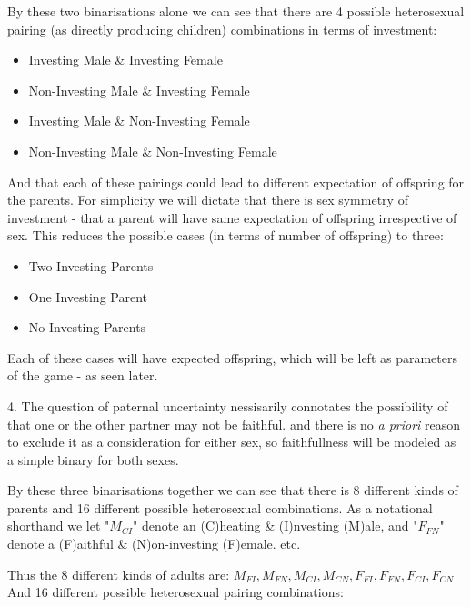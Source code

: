 \documentclass[journal,article,accept,oneauthors,pdftex,10pt,a4paper]{mdpi}
\begin{document}
By these two binarisations alone we can see that there are 4 possible heterosexual pairing (as directly producing children) combinations in terms of investment: 
\begin{itemize}
  \item Investing Male \& Investing Female
  \item Non-Investing Male \& Investing Female
  \item Investing Male \& Non-Investing Female
  \item Non-Investing Male \& Non-Investing Female
\end{itemize}
And that each of these pairings could lead to different expectation of offspring for the parents. For simplicity we will dictate that there is sex symmetry of investment - that a parent will have same expectation of offspring irrespective of sex. This reduces the possible cases (in terms of number of offspring) to three:
\begin{itemize}
  \item Two Investing Parents
  \item One Investing Parent
  \item No Investing Parents
\end{itemize}
Each of these cases will have expected offspring, which will be left as parameters of the game - as seen later.

4. The question of paternal uncertainty nessisarily connotates the possibility of that one or the other partner may not be faithful. and there is no \textit{a priori} reason to exclude it as a consideration for either sex, so faithfullness will be modeled as a simple binary for both sexes.

By these three binarisations together we can see that there is 8 different kinds of parents and 16 different possible heterosexual combinations.
As a notational shorthand we let "$M_{CI}$" denote an (C)heating \& (I)nvesting (M)ale, and "$F_{FN}$" denote a (F)aithful \& (N)on-investing (F)emale. etc.

Thus the 8 different kinds of adults are: $ M_{FI}, M_{FN}, M_{CI}, M_{CN}, F_{FI}, F_{FN}, F_{CI}, F_{CN} $
And 16 different possible heterosexual pairing combinations:
\end{document}
